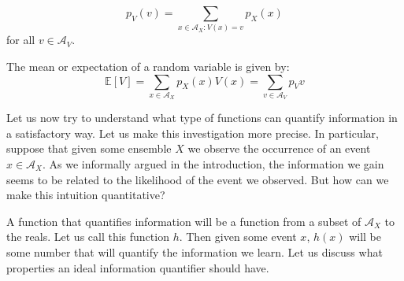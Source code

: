 \begin{equation}
p_V(v)=\sum_{x\in\mathcal A_X:V(x)=v}p_X(x)
\end{equation} 
for all $v\in\mathcal A_V$.

The mean or expectation of a random variable is given by:
\begin{equation}
\mathbb E[V]=\sum_{x\in\mathcal A_X}p_X(x)V(x)=\sum_{v\in\mathcal A_V}p_Vv
\end{equation}

Let us now try to understand what type of functions can quantify information in a satisfactory way. Let us make this investigation more precise. In particular, suppose that given some ensemble $X$ we observe the occurrence of an event $x\in\mathcal A_X$. As we informally argued in the introduction, the information we gain seems to be related to the likelihood of the event we observed. But how can we make this intuition quantitative? %

A function that quantifies information will be a function from a subset of $\mathcal A_X$ to the reals. 
Let us call this function $h$. 
Then given some event $x$, $h(x)$ will be some number that will quantify the information we learn. 
Let us discuss what properties an ideal information quantifier should have. 

